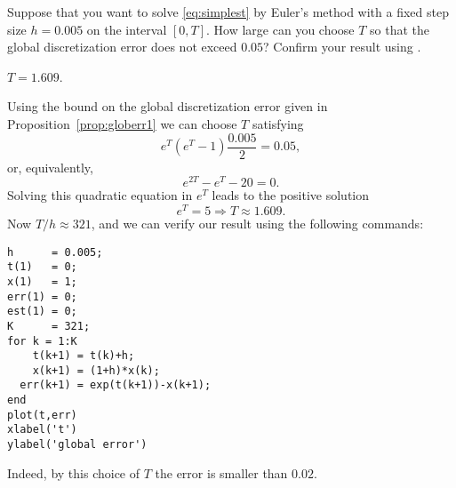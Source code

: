 \documentclass{ximera}
\begin{document}
\begin{exercise} \label{c15.2.4}
Suppose that you want to solve \eqref{eq:simplest} by Euler's
method with a fixed step size $h=0.005$ on the interval $[0,T]$.  
How large can you choose $T$ so that the global discretization
error does not exceed $0.05$?  Confirm your result using \Matlabp.

\begin{solution}
\ans $T=1.609$.

\soln Using the bound on the global discretization error
given in Proposition~\ref{prop:globerr1} we can choose
$T$ satisfying
\[
e^{T}(e^{T}-1)\frac{0.005}{2} = 0.05,
\]
or, equivalently,
\[
e^{2T} - e^T - 20 = 0.
\]
Solving this quadratic equation in $e^T$ leads to the positive
solution
\[
e^T = 5 \Rightarrow T \approx 1.609.
\]
Now $T/h \approx 321$, and we can verify our result using the
following \Matlab commands:
\begin{verbatim}
h      = 0.005;
t(1)   = 0;
x(1)   = 1;
err(1) = 0;
est(1) = 0;
K      = 321;
for k = 1:K
    t(k+1) = t(k)+h;
    x(k+1) = (1+h)*x(k);
  err(k+1) = exp(t(k+1))-x(k+1);
end
plot(t,err)
xlabel('t')
ylabel('global error')
\end{verbatim}
Indeed, by this choice of $T$ the error is smaller than $0.02$.




\end{solution}
\end{exercise}
\end{document}
